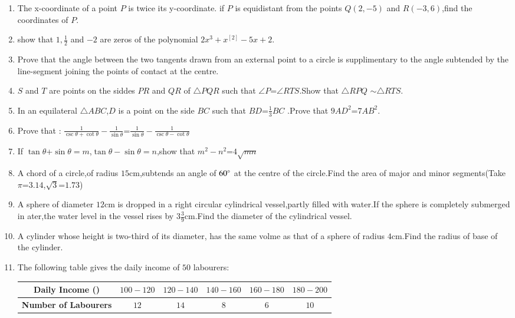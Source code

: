 \documentclass{article}
\begin{document}
\begin{enumerate}
\item The x-coordinate of a point $P$ is twice its y-coordinate. if $P$ is equidistant from the points $Q(2,-5)$ and $R(-3,6)$,find the coordinates of $P$.
\item show that $1,\frac{1}{2}$ and $-2$ are zeros of the polynomial  $2x^{3}+x^[2]-5x+2$.
\item Prove that  the angle between the two tangents drawn from an external point to a circle is supplimentary to  the angle subtended by the line-segment  joining the points of contact at the centre.
\item $S$ and $T$ are points on the siddes $PR$ and $QR$ of  $\triangle PQR$ such that $\angle P$=$\angle RTS$.Show that $\triangle RPQ$ $\sim\triangle RTS$.
\item In an equilateral $\triangle ABC$,$D$ is a point on the side $BC$ such that $BD$=$\frac{1}{3}BC$
.Prove that $9AD^2$=$7AB^2$.
\item Prove that : $\frac{1}{\csc\theta+\cot\theta}-\frac{1}{\sin\theta}$=$\frac{1}{\sin\theta}-\frac{1}{\csc\theta-\cot\theta}$
\item If $\tan\theta$+$\sin\theta=m$,$\tan\theta-\sin\theta=n$,show that $m^2-n^2$=$4\sqrt{mn}$
\item A chord of a circle,of radius $15$cm,subtends an angle of $60\degree{}$ at the centre of the circle.Find the area of major and minor segments(Take  $\pi$=$3.14$,$\sqrt{3}$=$1.73$)
\item A sphere of diameter $12$cm is dropped in a right circular cylindrical vessel,partly filled with water.If the sphere is completely submerged in ater,the water level in the vessel rises by $3\frac{3}{9}$cm.Find the diameter of the cylindrical vessel.
\item A cylinder whose height is two-third of its diameter, has the same volme as that of a sphere of radius $4$cm.Find the radius of base of the cylinder.
\item The following table gives the daily income of $50$ labourers: \\
	\begin{tabular}{|c|c|c|c|c|c|}             \hline                                                    \textbf{Daily Income (\rupee)} & $100-120$ & $120-140$ & $140-160$ & $160-180$ &  $180-200$ \\                                                    \hline                                                    \textbf{Number of Labourers} & $12$ & $14$ & $8$ & $6$ & $10$ \\
\hline
	\end{tabular} \\


\end{enumerate}
\end{document}

